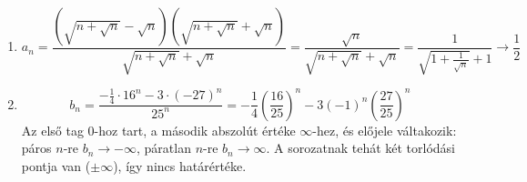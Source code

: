 \documentclass[11pt]{scrartcl}
\begin{document}
\begin{enumerate}
	\item \[
		      a_n
		      = \frac{\left(\sqrt{n + \sqrt{n}} - \sqrt{n}\right)\left(\sqrt{n + \sqrt{n}} + \sqrt{n}\right)}{\sqrt{n + \sqrt{n}} + \sqrt{n}}
		      = \frac{\sqrt{n}}{\sqrt{n + \sqrt{n}} + \sqrt{n}}
		      = \frac{1}{\sqrt{1 + \frac{1}{\sqrt{n}}} + 1}
		      \to \frac{1}{2}
	      \]

	\item \[
		      b_n
		      = \frac{-\frac{1}{4} \cdot 16^n - 3 \cdot (-27)^n}{25^n}
		      = -\frac{1}{4} \left(\frac{16}{25}\right)^n
		      - 3 (-1)^n \left(\frac{27}{25}\right)^n
	      \]
	      Az első tag $0$-hoz tart, a második abszolút értéke $\infty$-hez, és
	      előjele váltakozik: páros $n$-re $b_n \to -\infty$, páratlan $n$-re
	      $b_n \to \infty$. A sorozatnak tehát két torlódási pontja van
	      ($\pm \infty$), így nincs határértéke.
\end{enumerate}
\end{document}
